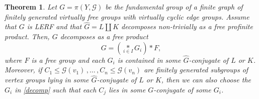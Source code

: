\documentclass[a4paper]{amsart}
\newtheorem{teo}[lem]{Theorem}
\theoremstyle{definition}
\theoremstyle{remark}
\newcommand{\G}{\mathcal G}
\begin{document}
\begin{teo}\label{main-thm} Let \(G=\pi(Y,\G) \) be the fundamental group of a finite graph of finitely generated virtually  free groups with virtually cyclic edge groups. Assume that \(G\) is LERF and that \(\widehat{G} = L\amalg K\) decomposes non-trivially as a free profinite product. Then, \(G\) decomposes as a free product 
\begin{equation}\label{decomp}
G= \left(\underset{i \in I}{\ast} G_i\right) * F, \end{equation}
where \(F\) is a free group and each \(G_i\) is contained in some \(\widehat{G}\)-conjugate of \(L\) or \(K\). Moreover,  if \(C_1\leq \G(v_1)\,,\ldots\,, C_n\leq \G(v_n)\) are finitely generated subgroups of vertex groups lying in some \(\widehat{G}\)-conjugate of \(L\) or \(K\), then we can also choose the \(G_i\) in \cref{decomp} such that each \(C_j\) lies in some \(G\)-conjugate of some \(G_i\).
\end{teo}
\end{document}
